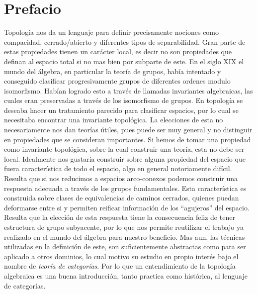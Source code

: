\section{Prefacio}
Topología nos da un lenguaje para definir precisamente nociones como
compacidad, cerrado/abierto y diferentes tipos de separabilidad. Gran
parte de estas propiedades tienen un carácter local, es decir no son
propiedades que definan al espacio total si no mas bien por subparte de
este. En el siglo XIX el mundo del álgebra, en particular la teoría de
grupos, había intentado y conseguido clasificar progresivamente grupos
de diferentes ordenes modulo isomorfismo. Habían logrado esto a través
de llamadas invariantes algebraicas, las cuales eran preservadas a
través de los isomorfismo de grupos. En topología se deseaba hacer un
tratamiento parecido para clasificar espacios, por lo cual se necesitaba
encontrar una invariante topológica. La elecciones de esta no
necesariamente nos dan teorías útiles, pues puede ser muy general y no
distinguir en propiedades que se consideran importantes. Si hemos de
tomar una propiedad como invariante topológica, sobre la cual construir
una teoría, esta no debe ser local. Idealmente nos gustaría construir
sobre alguna propiedad del espacio que fuera característica de todo el
espacio, algo en general notoriamente difícil. Resulta que si nos
reducimos a espacios arco-conexos podemos construir una respuesta
adecuada a través de los grupos fundamentales. Esta característica es
construida sobre clases de equivalencias de caminos cerrados, quienes
puedan deformarse entre si y permiten reificar información de los
``agujeros'' del espacio. Resulta que la elección de esta respuesta
tiene la consecuencia feliz de tener estructura de grupo subyacente, por
lo que nos permite reutilizar el trabajo ya realizado en el mundo del
álgebra para nuestro beneficio. Mas aun, las técnicas utilizadas en la
definición de este, son suficientemente abstractas como para ser
aplicado a otros dominios, lo cual motivo su estudio en propio interés
bajo el nombre de \emph{teoría de categorías}. Por lo que un
entendimiento de la topología algebraica es una buena introducción,
tanto practica como histórica, al lenguaje de categorías.
